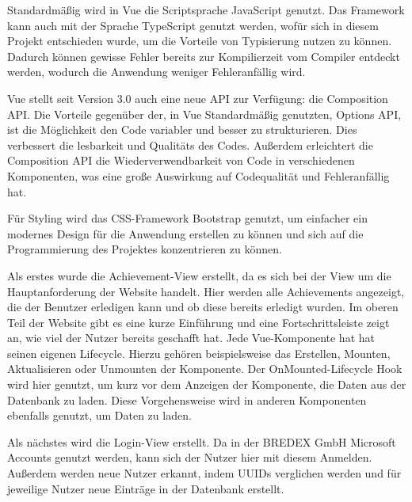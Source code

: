 \documentclass[12pt]{article}
\begin{document}
Standardmäßig wird in Vue die Scriptsprache JavaScript genutzt. Das Framework
kann auch mit der Sprache TypeScript genutzt werden, wofür sich in diesem
Projekt entschieden wurde, um die Vorteile von Typisierung nutzen zu können.
Dadurch können gewisse Fehler bereits zur Kompilierzeit vom Compiler entdeckt werden,
wodurch die Anwendung weniger Fehleranfällig wird.


Vue stellt seit Version 3.0 auch eine neue API zur Verfügung: die Composition API.
Die Vorteile gegenüber der, in Vue Standardmäßig genutzten, Options API, ist die Möglichkeit
den Code variabler und besser zu strukturieren. Dies verbessert die lesbarkeit und Qualitäts des
Codes. Außerdem erleichtert die Composition API die Wiederverwendbarkeit
von Code in verschiedenen Komponenten, was eine große Auswirkung auf Codequalität und
Fehleranfällig hat.

Für Styling wird das CSS-Framework Bootstrap genutzt, um einfacher ein modernes
Design für die Anwendung erstellen zu können und sich auf die Programmierung des
Projektes konzentrieren zu können.


Als erstes wurde die Achievement-View erstellt, da es sich bei der View um die
Hauptanforderung der Website handelt. Hier werden alle Achievements angezeigt, die
der Benutzer erledigen kann und ob diese bereits erledigt wurden.
Im oberen Teil der Website gibt es eine kurze Einführung und eine Fortschrittsleiste
zeigt an, wie viel der Nutzer bereits geschafft hat.
Jede Vue-Komponente hat
hat seinen eigenen Lifecycle. Hierzu gehören beispielsweise das Erstellen, Mounten,
Aktualisieren oder Unmounten der Komponente. Der OnMounted-Lifecycle Hook wird hier genutzt,
um kurz vor dem Anzeigen der Komponente, die Daten aus der Datenbank zu laden.
Diese Vorgehensweise wird in anderen Komponenten ebenfalls genutzt, um Daten zu laden. 

Als nächstes wird die Login-View erstellt. Da in der BREDEX GmbH Microsoft Accounts
genutzt werden, kann sich der Nutzer hier mit diesem Anmelden. Außerdem werden neue Nutzer
erkannt, indem UUIDs verglichen werden und für jeweilige Nutzer neue Einträge in der
Datenbank erstellt.
\end{document}
